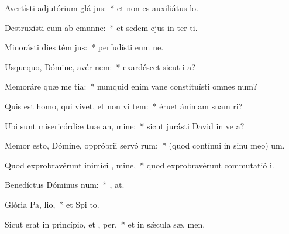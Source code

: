 \item Avertísti adjutórium glá jus:~* et non es auxiliátus   lo.
\item Destruxísti eum ab emunne:~* et sedem ejus in ter ti.
\item Minorásti dies tém jus:~* perfudísti eum ne.
\item Usquequo, Dómine, avér  nem:~* exardéscet sicut i  a?
\item Memoráre quæ me tia:~* numquid enim vane constituísti omnes  num?
\item Quis est homo, qui vivet, et non vi tem:~* éruet ánimam suam   ri?
\item Ubi sunt misericórdiæ tuæ an, mine:~* sicut jurásti David in ve a?
\item Memor esto, Dómine, oppróbrii servó rum:~* (quod contínui in sinu meo)  um.
\item Quod exprobravérunt inimíci , mine,~* quod exprobravérunt commutatió  i.
\item Benedíctus Dóminus  num:~* , at.
\item Glória Pa,  lio,~* et Spi to.
\item Sicut erat in princípio, et ,  per,~* et in sǽcula sæ. men.
